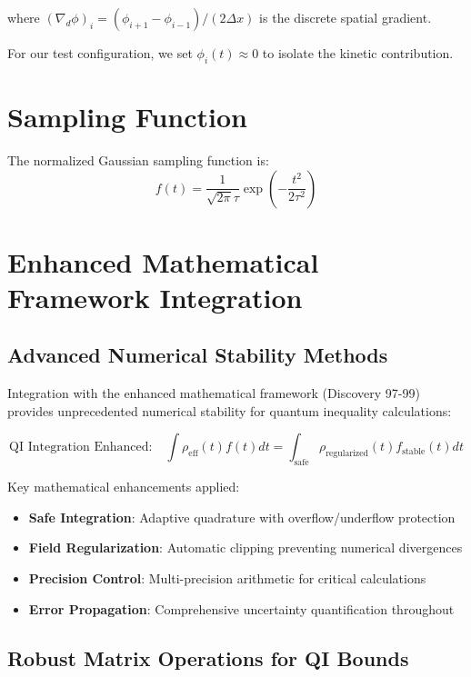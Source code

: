 \documentclass[11pt]{article}
\begin{document}
where $(\nabla_d \phi)_i = (\phi_{i+1} - \phi_{i-1})/(2\Delta x)$ is the discrete spatial gradient.

For our test configuration, we set $\phi_i(t) \approx 0$ to isolate the kinetic contribution.

\section{Sampling Function}

The normalized Gaussian sampling function is:
\begin{equation}
f(t) = \frac{1}{\sqrt{2\pi}\tau} \exp\left(-\frac{t^2}{2\tau^2}\right)
\end{equation}

\section{Enhanced Mathematical Framework Integration}

\subsection{Advanced Numerical Stability Methods}

Integration with the enhanced mathematical framework (Discovery 97-99) provides unprecedented numerical stability for quantum inequality calculations:

\begin{equation}
\text{QI Integration Enhanced:} \quad \int \rho_{\text{eff}}(t) f(t) dt = \int_{\text{safe}} \rho_{\text{regularized}}(t) f_{\text{stable}}(t) dt
\end{equation}

Key mathematical enhancements applied:
\begin{itemize}
\item \textbf{Safe Integration}: Adaptive quadrature with overflow/underflow protection
\item \textbf{Field Regularization}: Automatic clipping preventing numerical divergences  
\item \textbf{Precision Control}: Multi-precision arithmetic for critical calculations
\item \textbf{Error Propagation}: Comprehensive uncertainty quantification throughout
\end{itemize}

\subsection{Robust Matrix Operations for QI Bounds}
\end{document}
